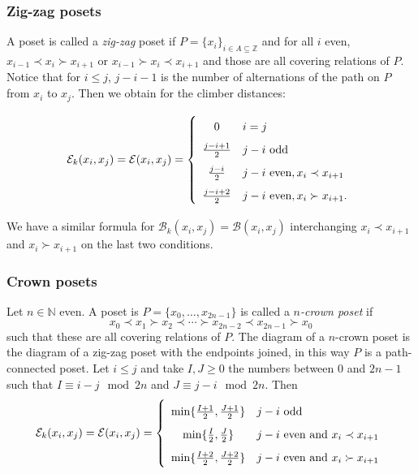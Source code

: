\documentclass{article}[12pt]
\theoremstyle{exampstyle}
\theoremstyle{remark}
\newcommand{\N}{\mathbb{N}}
\newcommand{\Z}{\mathbb{Z}}
\newcommand{\B}{\mathcal{B}}
\newcommand{\E}{\mathcal{E}}
\newcommand{\tuple}[3][1]{#2_{#1}, \dots , #2_{#3}}
\begin{document}
\subsubsection*{Zig-zag posets} 

A poset is called a \textit{zig-zag} poset if $P = \{x_i\}_{i \in A \subseteq \Z}$ and for all $i$ even, $x_{i-1} \prec x_i \succ x_{i+1}$ or $x_{i-1} \succ x_i \prec x_{i+1}$ and those are all covering relations of $P$. Notice that  for $i \leq j$, $j- i-1$ is the number of alternations of the path on $P$ from $x_i$ to $x_j$. Then we obtain for the climber distances:

\begin{equation*}
    \E_k(x_i,x_j) = \E(x_i,x_j) = \left\{ 
    \def\arraystretch{1.7}
    \begin{array}{cl}
        0 & i=j \\
        \frac{j-i +1 }{2} &  j-i \text{ odd} \\
        \frac{j-i}{2} & j-i \text{ even}, x_i \prec x_{i+1}\\
        \frac{j-i+2}{2} & j-i \text{ even}, x_i \succ x_{i+1}. \\
    \end{array}
    \right.
\end{equation*}

We have a similar formula for $ \B_k(x_i,x_j) = \B(x_i,x_j)$ interchanging $x_i \prec x_{i+1}$ and $x_i \succ x_{i+1}$ on the last two conditions.


\subsubsection*{Crown posets} 

Let $n \in \N$ even. A poset  is $P = \{ \tuple[0]{x}{2n-1}\}$ is called a \textit{$n$-crown poset} if \[x_0 \prec x_1 \succ x_2 \prec \cdots \succ x_{2n-2} \prec x_{2n-1} \succ x_0\]
such that these are all covering relations of $P$.  The diagram of a $n$-crown poset is the diagram of a zig-zag poset with the endpoints joined, in this way $P$ is a path-connected poset. Let $i \leq j$ and take $I,J \geq 0 $ the numbers between 0 and $2n-1$ such that $I \equiv i-j \mod 2n$ and $J \equiv j-i \mod 2n $. Then
    \begin{equation*}
        \E_k(x_i,x_j) = \E(x_i,x_j) = \left\{ 
        \def\arraystretch{1.7}
        \begin{array}{cl}
            \min \{ \frac{I +1 }{2}, \frac{J +1 }{2} \} &  j-i \text{ odd} \\
            \min \{ \frac{I }{2}, \frac{J}{2} \}  & j-i \text{ even and }  x_i \prec x_{i+1}\\
            \min \{ \frac{I +2 }{2}, \frac{J+2 }{2} \}  & j-i \text{ even and } x_i \succ x_{i+1}\\
        \end{array}
        \right.
    \end{equation*}
\end{document}
